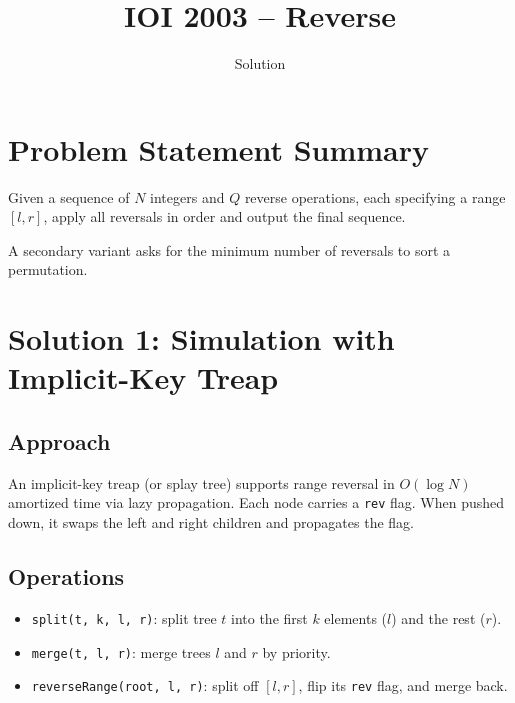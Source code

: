 \documentclass[11pt,a4paper]{article}
\title{IOI 2003 -- Reverse}
\author{Solution}
\date{}
\begin{document}
\maketitle

\section{Problem Statement Summary}
Given a sequence of $N$ integers and $Q$ reverse operations, each
specifying a range $[l, r]$, apply all reversals in order and output the
final sequence.

A secondary variant asks for the minimum number of reversals to sort a
permutation.

\section{Solution 1: Simulation with Implicit-Key Treap}

\subsection{Approach}
An implicit-key treap (or splay tree) supports range reversal in
$O(\log N)$ amortized time via lazy propagation. Each node carries a
\texttt{rev} flag. When pushed down, it swaps the left and right
children and propagates the flag.

\subsection{Operations}
\begin{itemize}
  \item \texttt{split(t, k, l, r)}: split tree $t$ into the first $k$
        elements ($l$) and the rest ($r$).
  \item \texttt{merge(t, l, r)}: merge trees $l$ and $r$ by priority.
  \item \texttt{reverseRange(root, l, r)}: split off
        $[l, r]$, flip its \texttt{rev} flag, and merge back.
\end{itemize}
\end{document}
